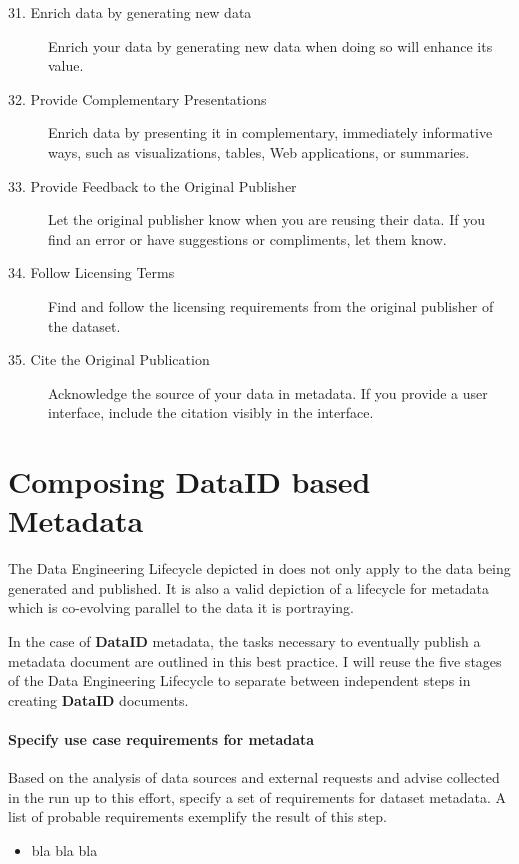 \documentclass[a4paper,english,twoside,BCOR1.5cm,headsepline,DIV12,appendixprefix,final,12pt]{scrbook}
\newcommand{\dataid}{{\ttfamily\bfseries DataID}\xspace}
\begin{document}
\begin{description}
\item[31. Enrich data by generating new data] Enrich your data by generating new data when doing so will enhance its value.
\item[32. Provide Complementary Presentations] Enrich data by presenting it in complementary, immediately informative ways, such as visualizations, tables, Web applications, or summaries.
\item[33. Provide Feedback to the Original Publisher] Let the original publisher know when you are reusing their data. If you find an error or have suggestions or compliments, let them know.
\item[34. Follow Licensing Terms] Find and follow the licensing requirements from the original publisher of the dataset.
\item[35. Cite the Original Publication] Acknowledge the source of your data in metadata. If you provide a user interface, include the citation visibly in the interface.
\end{description}
\fi

\section{Composing DataID based Metadata} 
\label{sec:composingmetadata}
The Data Engineering Lifecycle depicted in  does not only apply to the data being generated and published. It is also a valid depiction of a lifecycle for metadata which is co-evolving parallel to the data it is portraying.

In the case of \dataid metadata, the tasks necessary to eventually publish a metadata document are outlined in this best practice. I will reuse the five stages of the 
Data Engineering Lifecycle to separate between independent steps in creating \dataid documents.

\paragraph{Specify use case requirements for metadata}
\label{sec:wfspecify}

Based on the analysis of data sources and external requests and advise collected in the run up to this effort, specify a set of requirements for dataset metadata. A list of probable requirements exemplify the result of this step.

\begin{itemize}
\item bla bla bla 
\end{itemize}
\end{document}
